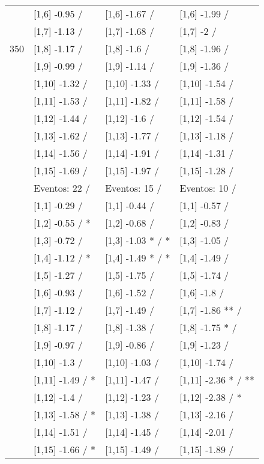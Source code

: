 \begin{table}
\begin{tabular}[t]{llll}
 & {}[1,6] -0.95  / & {}[1,6] -1.67  / & {}[1,6] -1.99  /\\
 & {}[1,7] -1.13  / & {}[1,7] -1.68  / & {}[1,7] -2  /\\
350 & {}[1,8] -1.17  / & {}[1,8] -1.6  / & {}[1,8] -1.96  /\\
\addlinespace
 & {}[1,9] -0.99  / & {}[1,9] -1.14  / & {}[1,9] -1.36  /\\
 & {}[1,10] -1.32  / & {}[1,10] -1.33  / & {}[1,10] -1.54  /\\
 & {}[1,11] -1.53  / & {}[1,11] -1.82  / & {}[1,11] -1.58  /\\
 & {}[1,12] -1.44  / & {}[1,12] -1.6  / & {}[1,12] -1.54  /\\
 & {}[1,13] -1.62  / & {}[1,13] -1.77  / & {}[1,13] -1.18  /\\
\addlinespace
 & {}[1,14] -1.56  / & {}[1,14] -1.91  / & {}[1,14] -1.31  /\\
 & {}[1,15] -1.69  / & {}[1,15] -1.97  / & {}[1,15] -1.28  /\\
 & Eventos:  22 / & Eventos:  15 / & Eventos:  10 /\\
 & {}[1,1] -0.29  / & {}[1,1] -0.44  / & {}[1,1] -0.57  /\\
 & {}[1,2] -0.55  / * & {}[1,2] -0.68  / & {}[1,2] -0.83  /\\
\addlinespace
 & {}[1,3] -0.72  / & {}[1,3] -1.03 * / * & {}[1,3] -1.05  /\\
 & {}[1,4] -1.12  / * & {}[1,4] -1.49 * / * & {}[1,4] -1.49  /\\
 & {}[1,5] -1.27  / & {}[1,5] -1.75  / & {}[1,5] -1.74  /\\
 & {}[1,6] -0.93  / & {}[1,6] -1.52  / & {}[1,6] -1.8  /\\
 & {}[1,7] -1.12  / & {}[1,7] -1.49  / & {}[1,7] -1.86 ** /\\
\addlinespace
500 & {}[1,8] -1.17  / & {}[1,8] -1.38  / & {}[1,8] -1.75 * /\\
 & {}[1,9] -0.97  / & {}[1,9] -0.86  / & {}[1,9] -1.23  /\\
 & {}[1,10] -1.3  / & {}[1,10] -1.03  / & {}[1,10] -1.74  /\\
 & {}[1,11] -1.49  / * & {}[1,11] -1.47  / & {}[1,11] -2.36 * / **\\
 & {}[1,12] -1.4  / & {}[1,12] -1.23  / & {}[1,12] -2.38  / *\\
\addlinespace
 & {}[1,13] -1.58  / * & {}[1,13] -1.38  / & {}[1,13] -2.16  /\\
 & {}[1,14] -1.51  / & {}[1,14] -1.45  / & {}[1,14] -2.01  /\\
 & {}[1,15] -1.66  / * & {}[1,15] -1.49  / & {}[1,15] -1.89  /\\
\bottomrule
\end{tabular}
\end{table}
